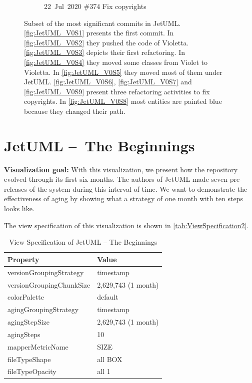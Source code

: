 \begin{figure}[ht]
\begin{subfigure}{0.32\textwidth}
        \caption{\mbox{22 Jul 2020}  \hfill  \linebreak  \#374 Fix copyrights} 
        \label{fig:JetUML_V0S9}
    \end{subfigure}
    \hspace*{\fill}
    \medskip
    \caption[Subset of the most significant commits in JetUML]{
        Subset of the most significant commits in JetUML. \autoref{fig:JetUML_V0S1} presents the first commit. In \autoref{fig:JetUML_V0S2} they pushed the code of Violetta. \autoref{fig:JetUML_V0S3} depicts their first refactoring. In \autoref{fig:JetUML_V0S4} they moved some classes from Violet to Violetta. In \autoref{fig:JetUML_V0S5} they moved most of them under JetUML. \autoref{fig:JetUML_V0S6}, \autoref{fig:JetUML_V0S7} and \autoref{fig:JetUML_V0S9} present three refactoring activities to fix copyrights. In \autoref{fig:JetUML_V0S8} most entities are painted blue because they changed their path.} 
    \label{fig:JetUML_V0}
\end{figure}

\clearpage
\section{JetUML – The Beginnings}

\noindent
\textbf{Visualization goal:}
With this visualization, we present how the repository evolved through its first six months. 
The authors of JetUML made seven pre-releases of the system during this interval of time.
We want to demonstrate the effectiveness of aging by showing what a strategy of one month with ten steps looks like. 

The view specification of this visualization is shown in \autoref{tab:ViewSpecification2}.
\begin{table}[h]
	\small
    \centering
    \begin{tabular}{@{}ll@{}} 
        \toprule
        \textbf{Property} & \textbf{Value} \\\midrule
        versionGroupingStrategy & timestamp\\ 
		versionGroupingChunkSize & 2,629,743 (1 month)\\
		colorPalette & default\\
		agingGroupingStrategy & timestamp \\
		agingStepSize & 2,629,743 (1 month) \\
		agingSteps & 10 \\
		mapperMetricName & SIZE \\
		fileTypeShape & all BOX \\
		fileTypeOpacity & all 1 \\\bottomrule
    \end{tabular}
    \caption{View Specification of JetUML – The Beginnings}
    \label{tab:ViewSpecification2}
\end{table}


